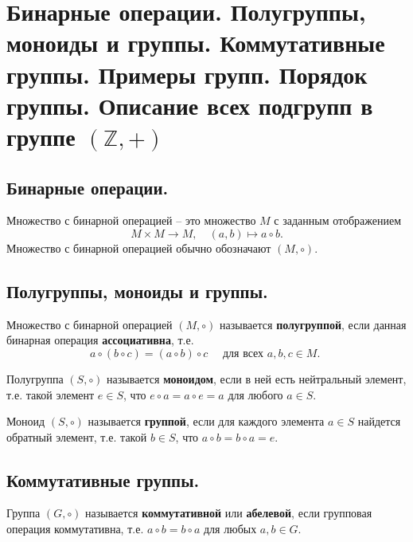 \section{Бинарные операции. Полугруппы, моноиды и группы. Коммутативные группы. Примеры групп. Порядок группы. Описание всех подгрупп в группе \texorpdfstring{$(\mathbb{Z}, +)$}.}



\subsection{Бинарные операции.}
\begin{definition}
    Множество с бинарной операцией -- это множество $M$ с заданным отображением
    \[
        M \times M \to M,
        \quad
        (a, b) \mapsto a \circ b.
    \]
    Множество с бинарной операцией обычно обозначают $(M, \circ)$.
\end{definition}

\subsection{Полугруппы, моноиды и группы.}
\begin{definition}
    Множество с бинарной операцией $(M, \circ)$ называется \textbf{полугруппой}, если данная бинарная операция \textbf{ассоциативна}, т.е.
    \[
        a \circ (b \circ c) = (a \circ b) \circ c
        \quad
        \text{ для всех $a,b,c \in M$. }
    \]
\end{definition}
\begin{definition}
    Полугруппа $(S, \circ)$ называется \textbf{моноидом}, если в ней есть нейтральный элемент, т.е. такой элемент $e \in S$, что $e \circ a = a \circ e = a$ для любого $a \in S$.
\end{definition}
\begin{definition}
    Моноид $(S, \circ)$ называется \textbf{группой}, если для каждого элемента $a \in S$ найдется обратный элемент, т.е. такой $b \in S$, что $a \circ b = b \circ a = e$.
\end{definition}

\subsection{Коммутативные группы.}
\begin{definition}
    Группа $(G, \circ)$ называется \textbf{коммутативной} или \textbf{абелевой}, если групповая операция коммутативна, т.е. $a \circ b = b \circ a$ для любых $a, b \in G$.
\end{definition}

